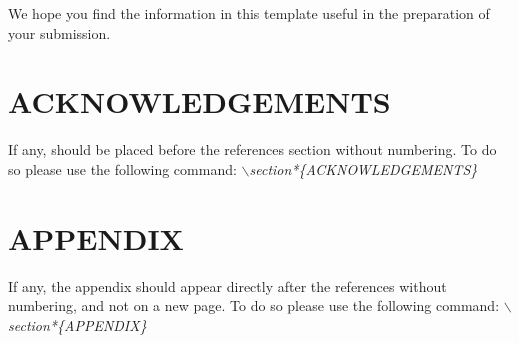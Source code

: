 \documentclass[a4paper,twoside]{article}
\begin{document}
We hope you find the information in this template useful in the preparation of your submission.


\section*{\uppercase{Acknowledgements}}

If any, should be placed before the references section
without numbering. To do so please use the following command:
\textit{$\backslash$section*\{ACKNOWLEDGEMENTS\}}



{\small
}


\section*{\uppercase{Appendix}}

If any, the appendix should appear directly after the
references without numbering, and not on a new page. To do so please use the following command:
\textit{$\backslash$section*\{APPENDIX\}}
\end{document}
